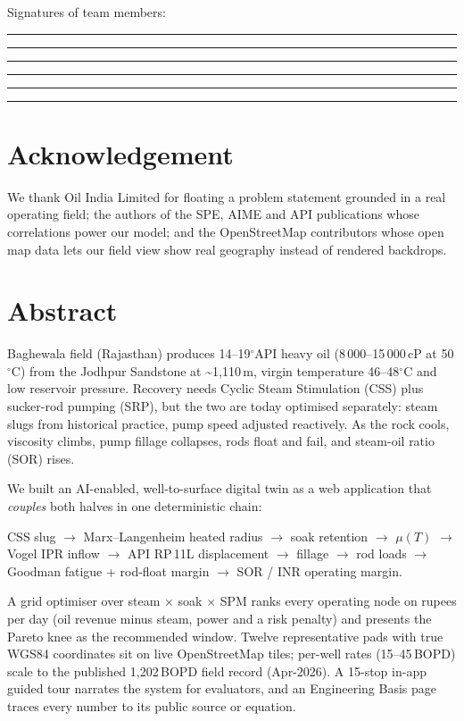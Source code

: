 \documentclass[12pt,a4paper]{report}
\begin{document}
\noindent Signatures of team members:\quad
\rule{3cm}{0.4pt}\quad \rule{3cm}{0.4pt}\quad \rule{3cm}{0.4pt}\quad
\rule{3cm}{0.4pt}\quad \rule{3cm}{0.4pt}\quad \rule{3cm}{0.4pt}

\chapter*{Acknowledgement}
We thank Oil India Limited for floating a problem statement grounded in a real
operating field; the authors of the SPE, AIME and API publications whose
correlations power our model; and the OpenStreetMap contributors whose open map
data lets our field view show real geography instead of rendered backdrops.

\chapter*{Abstract}
Baghewala field (Rajasthan) produces 14--19$^\circ$API heavy oil
(8\,000--15\,000\,cP at 50$^\circ$C) from the Jodhpur Sandstone at
\textasciitilde1,110\,m, virgin temperature 46--48$^\circ$C and low reservoir
pressure. Recovery needs Cyclic Steam Stimulation (CSS) plus sucker-rod pumping
(SRP), but the two are today optimised separately: steam slugs from historical
practice, pump speed adjusted reactively. As the rock cools, viscosity climbs,
pump fillage collapses, rods float and fail, and steam-oil ratio (SOR) rises.

We built an AI-enabled, well-to-surface digital twin as a web application that
\emph{couples} both halves in one deterministic chain:
\begin{center}
CSS slug $\rightarrow$ Marx--Langenheim heated radius $\rightarrow$ soak
retention $\rightarrow$ $\mu(T)$ $\rightarrow$ Vogel IPR inflow
$\rightarrow$ API RP\,11L displacement $\rightarrow$ fillage
$\rightarrow$ rod loads $\rightarrow$ Goodman fatigue + rod-float margin
$\rightarrow$ SOR / INR operating margin.
\end{center}
A grid optimiser over steam $\times$ soak $\times$ SPM ranks every operating
node on rupees per day (oil revenue minus steam, power and a risk penalty) and
presents the Pareto knee as the recommended window. Twelve representative pads
with true WGS84 coordinates sit on live OpenStreetMap tiles; per-well rates
(15--45\,BOPD) scale to the published 1,202\,BOPD field record (Apr-2026).
A 15-stop in-app guided tour narrates the system for evaluators, and an
Engineering Basis page traces every number to its public source or equation.
\end{document}
